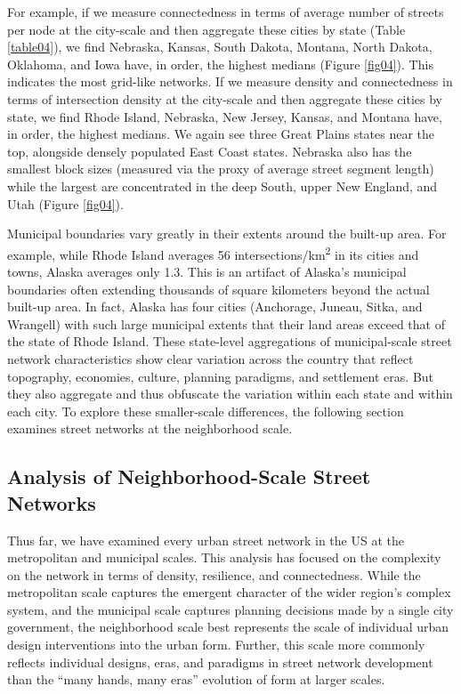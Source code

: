 \documentclass{article}
\begin{document}
For example, if we measure connectedness in terms of average number of streets per node at the city-scale and then aggregate these cities by state (Table \ref{table04}), we find Nebraska, Kansas, South Dakota, Montana, North Dakota, Oklahoma, and Iowa have, in order, the highest medians (Figure \ref{fig04}). This indicates the most grid-like networks. If we measure density and connectedness in terms of intersection density at the city-scale and then aggregate these cities by state, we find Rhode Island, Nebraska, New Jersey, Kansas, and Montana have, in order, the highest medians. We again see three Great Plains states near the top, alongside densely populated East Coast states. Nebraska also has the smallest block sizes (measured via the proxy of average street segment length) while the largest are concentrated in the deep South, upper New England, and Utah (Figure \ref{fig04}).

Municipal boundaries vary greatly in their extents around the built-up area. For example, while Rhode Island averages 56 intersections/km\textsuperscript{2} in its cities and towns, Alaska averages only 1.3. This is an artifact of Alaska's municipal boundaries often extending thousands of square kilometers beyond the actual built-up area. In fact, Alaska has four cities (Anchorage, Juneau, Sitka, and Wrangell) with such large municipal extents that their land areas exceed that of the state of Rhode Island. These state-level aggregations of municipal-scale street network characteristics show clear variation across the country that reflect topography, economies, culture, planning paradigms, and settlement eras. But they also aggregate and thus obfuscate the variation within each state and within each city. To explore these smaller-scale differences, the following section examines street networks at the neighborhood scale.



\subsection{Analysis of Neighborhood-Scale Street Networks}

Thus far, we have examined every urban street network in the US at the metropolitan and municipal scales. This analysis has focused on the complexity on the network in terms of density, resilience, and connectedness. While the metropolitan scale captures the emergent character of the wider region's complex system, and the municipal scale captures planning decisions made by a single city government, the neighborhood scale best represents the scale of individual urban design interventions into the urban form. Further, this scale more commonly reflects individual designs, eras, and paradigms in street network development than the \enquote{many hands, many eras} evolution of form at larger scales.
\end{document}
